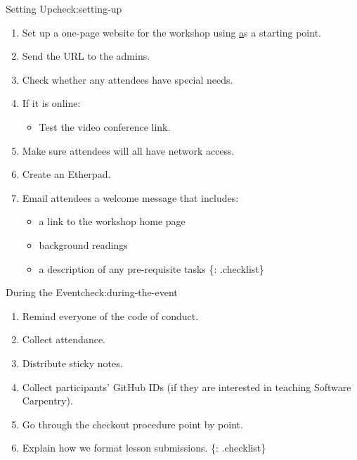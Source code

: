 \begin{checklist}{Setting Up}{check:setting-up}

\begin{enumerate}
\item
  Set up a one-page website for the workshop using
  \href{https://github.com/swcarpentry/training-template} as a starting
  point.
\item
  Send the URL to the admins.
\item
  Check whether any attendees have special needs.
\item
  If it is online:

  \begin{itemize}
    \item
    Test the video conference link.
  \end{itemize}
\item
  Make sure attendees will all have network access.
\item
  Create an Etherpad.
\item
  Email attendees a welcome message that includes:

  \begin{itemize}
    \item
    a link to the workshop home page
  \item
    background readings
  \item
    a description of any pre-requisite tasks \{: .checklist\}
  \end{itemize}
\end{enumerate}
\end{checklist}

\begin{checklist}{During the Event}{check:during-the-event}

\begin{enumerate}
\item
  Remind everyone of the code of conduct.
\item
  Collect attendance.
\item
  Distribute sticky notes.
\item
  Collect participants' GitHub IDs (if they are interested in teaching
  Software Carpentry).
\item
  Go through
  the checkout procedure point by point.
\item
  Explain how we
  format lesson submissions. \{: .checklist\}
\end{enumerate}
\end{checklist}

